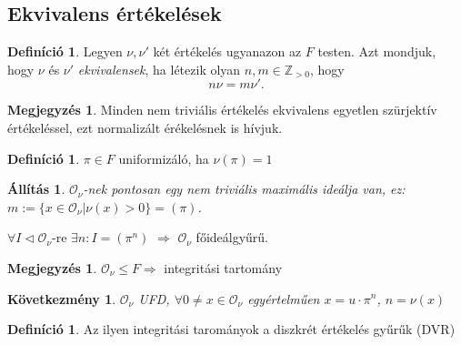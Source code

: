 \documentclass[11pt,a4paper]{article}
\newtheorem{allitas}[tetel]{Állítás}
\newtheorem{kovetkezmeny}[tetel]{Következmény}
\theoremstyle{definition}
\newtheorem{definicio}[tetel]{Definíció}
\newtheorem{megjegyzes}[tetel]{Megjegyzés}
\newcommand{\OO}{\mathcal O}
\begin{document}
\subsection{Ekvivalens értékelések}

\begin{definicio}
Legyen $\nu,\nu'$ két értékelés ugyanazon az $F$ testen.
Azt mondjuk, hogy $\nu$ és $\nu'$ \emph{ekvivalensek},
ha létezik olyan $n,m\in\mathbb Z_{>0}$, hogy
\[
  n\nu = m\nu'.
\]
\end{definicio}

\begin{megjegyzes}
Minden nem triviális értékelés ekvivalens egyetlen
szürjektív értékeléssel, ezt normalizált érékelésnek is hívjuk.
\end{megjegyzes}
\begin{definicio}
    $\pi \in F$ uniformizáló, ha $\nu(\pi)=1$
\end{definicio}
\begin{allitas}
    $\OO_\nu$-nek pontosan egy nem triviális maximális ideálja van, ez:
    $m:= \{x\in\OO_\nu|\nu(x)>0\}=(\pi)$.
\end{allitas}
$\forall I \lhd \OO_\nu$-re $\exists n: I=(\pi^n)$ $\Rightarrow$ $\OO_\nu$ főideálgyűrű.

\begin{megjegyzes}
    $\OO_\nu \leq F \Rightarrow$ integritási tartomány
\end{megjegyzes}
\begin{kovetkezmeny}
   $ \OO_\nu$ UFD, $\forall 0 \neq x \in \OO_\nu$ egyértelműen $x= u\cdot \pi^n$, $n=\nu(x)$
\end{kovetkezmeny}
\begin{definicio}
    Az ilyen integritási tarományok a diszkrét értékelés gyűrűk (DVR)
\end{definicio}
\end{document}
